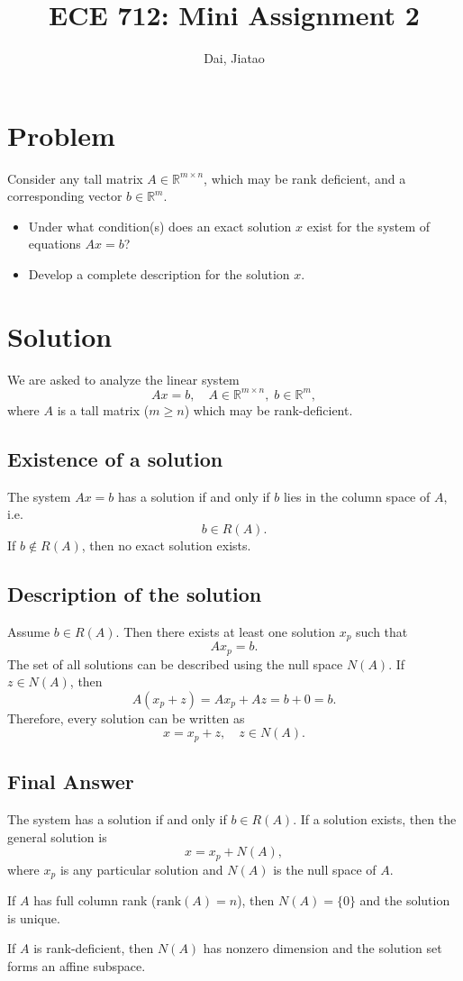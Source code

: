 \documentclass[12pt]{article}
\title{ECE 712: Mini Assignment 2}
\author{Dai, Jiatao}
\date{}
\begin{document}
\maketitle

\section*{Problem}
Consider any tall matrix $A \in \mathbb{R}^{m \times n}$, which may be rank deficient, and a corresponding vector $b \in \mathbb{R}^m$.

\begin{itemize}
    \item Under what condition(s) does an exact solution $x$ exist for the system of equations $Ax = b$?
    \item Develop a complete description for the solution $x$. 
\end{itemize}

\section*{Solution}

We are asked to analyze the linear system
\[
A x = b, \quad A \in \mathbb{R}^{m \times n}, \; b \in \mathbb{R}^m,
\]
where $A$ is a tall matrix ($m \geq n$) which may be rank-deficient.

\subsection*{Existence of a solution}
The system $Ax = b$ has a solution if and only if $b$ lies in the column space of $A$, i.e.
\[
b \in R(A).
\]
If $b \notin R(A)$, then no exact solution exists.

\subsection*{Description of the solution}
Assume $b \in R(A)$. Then there exists at least one solution $x_p$ such that
\[
A x_p = b.
\]
The set of all solutions can be described using the null space $N(A)$.  
If $z \in N(A)$, then
\[
A(x_p + z) = A x_p + A z = b + 0 = b.
\]
Therefore, every solution can be written as
\[
x = x_p + z, \quad z \in N(A).
\]

\subsection*{Final Answer}
The system has a solution if and only if $b \in R(A)$.  
If a solution exists, then the general solution is
\[
x = x_p + N(A),
\]
where $x_p$ is any particular solution and $N(A)$ is the null space of $A$.

\noindent If $A$ has full column rank ($\text{rank}(A) = n$), then $N(A) = \{0\}$ and the solution is unique.

\noindent If $A$ is rank-deficient, then $N(A)$ has nonzero dimension and the solution set forms an affine subspace.
\end{document}
